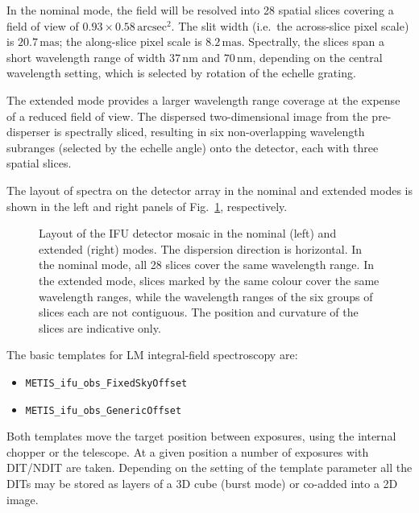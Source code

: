In the nominal mode, the field will be resolved into 28 spatial slices
covering a field of view of $0.93\times0.58\,\mathrm{arcsec^{2}}$.
The slit width (i.e.\ the across-slice pixel scale) is
$20.7\,\mathrm{mas}$; the along-slice pixel scale is
$8.2\,\mathrm{mas}$. Spectrally, the slices span a short wavelength
range of width $37\,\mathrm{nm}$ and $70\,\mathrm{nm}$, depending on
the central wavelength setting, which is selected by rotation of the
echelle grating.

The extended mode provides a larger wavelength range coverage at the
expense of a reduced field of view. The dispersed two-dimensional
image from the pre-disperser is spectrally sliced, resulting in six
non-overlapping wavelength subranges (selected by the echelle angle)
onto the detector, each with three spatial slices.

The layout of spectra on the detector array in the nominal and
extended modes is shown in the left and right panels of
Fig.~\ref{fig:IFU_detector_layout}, respectively.

\begin{figure}[ht]
  \centering
  \hfill
  \caption[IFU detector layout]{Layout of the IFU detector mosaic
    in the nominal (left) and extended (right) modes. The dispersion
    direction is horizontal. In the nominal mode, all 28 slices cover
    the same wavelength range. In the extended mode, slices marked by
    the same colour cover the same wavelength ranges, while the
    wavelength ranges of the six groups of slices each are not
    contiguous. The position and curvature of the slices are
    indicative only. }
  \label{fig:IFU_detector_layout}
\end{figure}

The basic templates for LM integral-field spectroscopy are:
\begin{itemize}
\item \lstinline{METIS_ifu_obs_FixedSkyOffset}
\item \lstinline{METIS_ifu_obs_GenericOffset}
\end{itemize}
Both templates move the target position between exposures, using the
internal chopper or the telescope. At a given position a number of
exposures with DIT/NDIT are taken. Depending on the setting of the
template parameter  all the DITs may be stored as
layers of a 3D cube (burst mode) or co-added into a 2D image.

